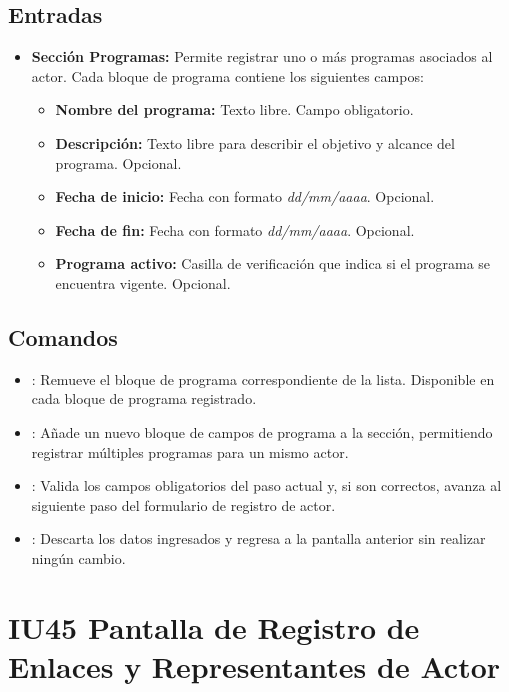 \subsection{Entradas}
\begin{itemize}
	\item \textbf{Sección Programas:} Permite registrar uno o más programas 
	asociados al actor. Cada bloque de programa contiene los siguientes campos:
	\begin{itemize}
		\item \textbf{Nombre del programa:} Texto libre. Campo obligatorio.
		\item \textbf{Descripción:} Texto libre para describir el objetivo y 
		alcance del programa. Opcional.
		\item \textbf{Fecha de inicio:} Fecha con formato \textit{dd/mm/aaaa}. 
		Opcional.
		\item \textbf{Fecha de fin:} Fecha con formato \textit{dd/mm/aaaa}. 
		Opcional.
		\item \textbf{Programa activo:} Casilla de verificación que indica si 
		el programa se encuentra vigente. Opcional.
	\end{itemize}
\end{itemize}

\subsection{Comandos}
\begin{itemize}
	\item {}: Remueve el bloque de programa correspondiente de 
	la lista. Disponible en cada bloque de programa registrado.
	\item {}: Añade un nuevo bloque de campos de 
	programa a la sección, permitiendo registrar múltiples programas para un 
	mismo actor.
	\item {}: Valida los campos obligatorios del paso actual 
	y, si son correctos, avanza al siguiente paso del formulario de registro de 
	actor.
	\item {}: Descarta los datos ingresados y regresa a la 
	pantalla anterior sin realizar ningún cambio.
\end{itemize}


\section{IU45 Pantalla de Registro de Enlaces y Representantes de Actor}
